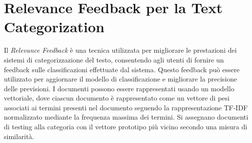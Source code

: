 \documentclass{report}
\begin{document}
	\section{Relevance Feedback per la Text Categorization}
	Il \textit{Relevance Feedback} è una tecnica utilizzata per migliorare le prestazioni dei sistemi di categorizzazione del testo, consentendo agli utenti di fornire un feedback sulle classificazioni effettuate dal sistema. Questo feedback può essere utilizzato per aggiornare il modello di classificazione e migliorare la precisione delle previsioni. I documenti possono essere rappresentati usando un modello vettoriale, dove ciascun documento è rappresentato come un vettore di pesi associati ai termini presenti nel documento seguendo la rappresentazione TF-IDF normalizzato mediante la frequenza massima dei termini. Si assegnano documenti di testing alla categoria con il vettore prototipo più vicino secondo una misura di similarità.
\end{document}

